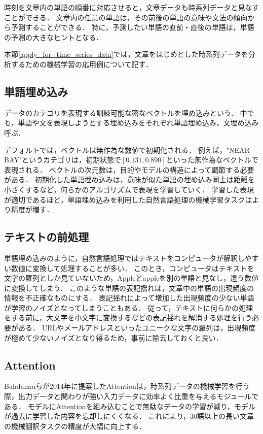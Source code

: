 \documentclass[12pt,a4j]{jreport}
\begin{document}
時刻を文章内の単語の順番に対応させると，文章データも時系列データと見なすことができる．
文章内の任意の単語は，その前後の単語の意味や文法の傾向から予測することができる．
特に，予測したい単語の直前・直後の単語は，単語の予測の大きなヒントとなる．

本節\ref{apply_for_time_series_data}では，文章をはじめとした時系列データを分析するための機械学習の応用例について記す．

\subsection{単語埋め込み}
データのカテゴリを表現する訓練可能な密なベクトルを埋め込みという\cite{aurellen20}．
中でも，単語や文を表現しようとする埋め込みをそれぞれ単語埋め込み，文埋め込み呼ぶ．

デフォルトでは，ベクトルは無作為な数値で初期化される．
例えば，"NEAR BAY"というカテゴリは，初期状態で$[0.131, 0.890]$といった無作為なベクトルで表現される．
ベクトルの次元数は，目的やモデルの構造によって調節する必要がある．
初期化した単語埋め込みは，意味が似た単語の埋め込み同士は距離を小さくするなど，何らかのアルゴリズムで表現を学習していく．
学習した表現が適切であるほど，単語埋め込みを利用した自然言語処理の機械学習タスクはより精度が増す．

\subsection{テキストの前処理}
\label{subsection_texts_preprocessing}
単語埋め込みのように，自然言語処理ではテキストをコンピュータが解釈しやすい数値に変換して処理することが多い．
このとき，コンピュータはテキストを文字の羅列としか見ていないため，Appleとappleを別の単語と見なし，違う数値に変換してしまう．
このような単語の表記揺れは，文章中の単語の出現頻度の情報を不正確なものにする．
表記揺れによって増加した出現頻度の少ない単語が学習のノイズとなってしまうこともある．
従って，テキストに何らかの処理をする前に，大文字を小文字に変換するなどの表記揺れを解消する処理を行う必要がある．
URLやメールアドレスといったユニークな文字の羅列は，出現頻度が極めて少ないノイズとなり得るため，事前に除去しておくと良い．


\subsection{Attention}
Bahdanauらが2014年に提案したAttentionは，時系列データの機械学習を行う際，出力データと関わりが強い入力データに効率よく比重を与えるモジュールである\cite{aurellen20}\cite{bahdanau_neural_2016}．
モデルにAttentionを組み込むことで無駄なデータの学習が減り，モデルが過去に学習した内容を忘却しにくくなる．
これにより，30語以上の長い文章の機械翻訳タスクの精度が大幅に向上する．
\end{document}
